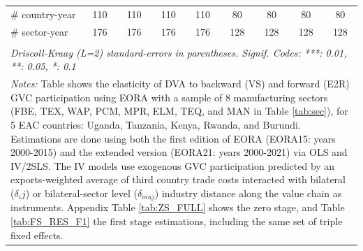 \documentclass[a4paper]{article}
\begin{document}
\begin{table}[h!]
{\begin{tabular}{lcccccccc}
      \# country-year         & 110                & 110                   & 110                    & 110                   & 80                 & 80                    & 80                     & 80\\  
      \# sector-year          & 176                & 176                   & 176                    & 176                   & 128                & 128                   & 128                    & 128\\ 
      \bottomrule \\ [-0.9em]
      \multicolumn{9}{l}{\emph{Driscoll-Kraay (L=2) standard-errors in parentheses. Signif. Codes: ***: 0.01, **: 0.05, *: 0.1}}\\
      \multicolumn{9}{l}{\parbox{1.25\textwidth}{\scriptsize
\textit{Notes:} Table shows the elasticity of DVA to backward (VS) and forward (E2R) GVC participation using EORA with a sample of 8 manufacturing sectors (FBE, TEX, WAP, PCM, MPR, ELM, TEQ, and MAN in Table \ref{tab:sec}), for 5 EAC countries: Uganda, Tanzania, Kenya, Rwanda, and Burundi. Estimations are done using both the first edition of EORA (EORA15: years 2000-2015) and the extended version (EORA21: years 2000-2021) via OLS and IV/2SLS. The IV models use exogenous GVC participation predicted by an exports-weighted average of third country trade costs interacted with bilateral ($\delta_ij$) or bilateral-sector level ($\delta_{oiuj}$) industry distance along the value chain as instruments. Appendix Table \ref{tab:ZS_FULL} shows the zero stage, and Table \ref{tab:FS_RES_F1} the first stage estimations, including the same set of triple fixed effects. }}
   \end{tabular}
   }
\end{table}
\FloatBarrier
\end{document}
